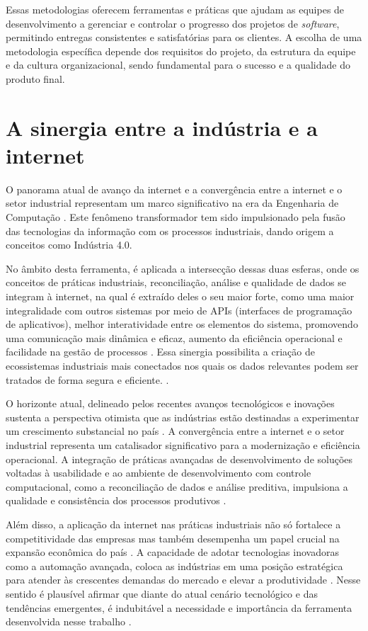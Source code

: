 Essas metodologias oferecem ferramentas e práticas que ajudam as equipes de desenvolvimento a gerenciar e controlar o progresso dos projetos de \textit{software}, permitindo entregas consistentes e satisfatórias para os clientes. A escolha de uma metodologia específica depende dos requisitos do projeto, da estrutura da equipe e da cultura organizacional, sendo fundamental para o sucesso e a qualidade do produto final.

\section{A sinergia entre a indústria e a internet} 

O panorama atual de avanço da internet e a convergência entre a internet e o setor industrial representam um marco significativo na era da Engenharia de Computação \cite{industry4status}. Este fenômeno transformador tem sido impulsionado pela fusão das tecnologias da informação com os processos industriais, dando origem a conceitos como Indústria 4.0. 
    
No âmbito desta ferramenta, é aplicada a intersecção dessas duas esferas, onde os conceitos de práticas industriais, reconciliação, análise e qualidade de dados se integram à internet, na qual é extraído deles o seu maior forte, como uma maior integralidade com outros sistemas por meio de APIs (interfaces de programação de aplicativos), melhor interatividade entre os elementos do sistema, promovendo uma comunicação mais dinâmica e eficaz, aumento da eficiência operacional e facilidade na gestão de processos \cite{industry4}. Essa sinergia possibilita a criação de ecossistemas industriais mais conectados nos quais os dados relevantes podem ser tratados de forma segura e eficiente. \cite{industrybuild}.
    
O horizonte atual, delineado pelos recentes avanços tecnológicos e inovações sustenta a perspectiva otimista que as indústrias estão destinadas a experimentar um crescimento substancial no país \cite{industrychina}. A convergência entre a internet e o setor industrial representa um catalisador significativo para a modernização e eficiência operacional. A integração de práticas avançadas de desenvolvimento de soluções voltadas à usabilidade e ao ambiente de desenvolvimento com controle computacional, como a reconciliação de dados e análise preditiva, impulsiona a qualidade e consistência dos processos produtivos \cite{industrydigital}.
    
Além disso, a aplicação da internet nas práticas industriais não só fortalece a competitividade das empresas mas também desempenha um papel crucial na expansão econômica do país \cite{industryiot}. A capacidade de adotar tecnologias inovadoras como a automação avançada, coloca as indústrias em uma posição estratégica para atender às crescentes demandas do mercado e elevar a produtividade \cite{industryinternet}. Nesse sentido é plausível afirmar que diante do atual cenário tecnológico e das tendências emergentes, é indubitável a necessidade e importância da ferramenta desenvolvida nesse trabalho \cite{industrychina}.